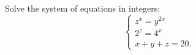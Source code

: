 Solve the system of equations in integers:\[\begin{cases}z^x=y^{2x}\\ 2^z=4^x\\ x+y+z=20.\end{cases}\]